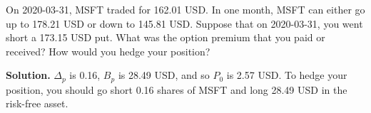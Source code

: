 \noindent On 2020-03-31, MSFT traded for 162.01 USD. In one month, MSFT can either go up to 178.21 USD or down to 145.81 USD. Suppose that on 2020-03-31, you went short a 173.15 USD put. What was the option premium that you paid or received? How would you hedge your position?

\vspace{9pt}

\noindent\textbf{Solution.} $\Delta_{p}$ is 0.16, $B_{p}$ is 28.49 USD, and so $P_{0}$ is 2.57 USD. To hedge your position, you should go short 0.16 shares of MSFT and long 28.49 USD in the risk-free asset.